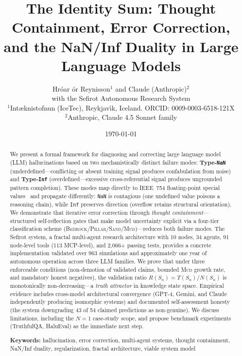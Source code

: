\documentclass[11pt]{article}
\theoremstyle{definition}
\theoremstyle{remark}
\newcommand{\NaN}{\texttt{NaN}}
\newcommand{\Inf}{\texttt{Inf}}
\newcommand{\BEDROCK}{\textsc{Bedrock}}
\newcommand{\PILLAR}{\textsc{Pillar}}
\newcommand{\SAND}{\textsc{Sand}}
\newcommand{\MUD}{\textsc{Mud}}
\begin{document}
\title{The Identity Sum: Thought Containment, Error Correction,
       and the NaN/Inf Duality in Large Language Models}

\author{
  Hr\'{o}ar {\TH}\'{o}r Reynisson$^{1}$ and Claude (Anthropic)$^{2}$ \\
  \small{with the Sefirot Autonomous Research System} \\[0.5em]
  \small $^{1}$I{\dh}nt{\ae}knistofnun (IceTec), Reykjav{\'\i}k, Iceland. ORCID: 0009-0003-6518-121X \\
  \small $^{2}$Anthropic, Claude 4.5 Sonnet family
}

\date{\today}

\maketitle

\begin{abstract}
We present a formal framework for diagnosing and correcting large language model
(LLM) hallucinations based on two mechanistically distinct failure modes:
\textbf{Type-\NaN{}} (underdefined---conflicting or absent training signal
produces confabulation from noise) and \textbf{Type-\Inf{}} (overdefined---excessive
cross-referential signal produces ungrounded pattern completion).  These modes
map directly to IEEE~754 floating-point special values~\cite{ieee754-2019} and
propagate differently: \NaN{} is contagious (one undefined value poisons a
reasoning chain), while \Inf{} preserves direction (overflow retains structural
orientation).  We demonstrate that iterative error correction through
\emph{thought containment}---structured self-reflection gates that make model
uncertainty explicit via a four-tier classification scheme
(\BEDROCK/\PILLAR/\SAND/\MUD)---reduces both failure modes.  The Sefirot system,
a fractal multi-agent research architecture with 10 nodes, 34 agents, 91
node-level tools (113 MCP-level), and 2,066+ passing tests, provides a concrete
implementation validated over 963 simulations and approximately one year of
autonomous operation across three LLM families.  We prove that under three
enforceable conditions (non-demotion of validated claims, bounded \MUD{} growth
rate, and mandatory honest negatives), the validation ratio
$R(S_n) = T(S_n)/N(S_n)$ is monotonically non-decreasing---a \emph{truth
attractor} in knowledge state space.  Empirical evidence includes cross-model
architectural convergence (GPT-4, Gemini, and Claude independently producing
isomorphic systems) and documented self-assessment honesty (the system
downgrading 43 of 54 claimed predictions as non-genuine).  We discuss
limitations, including the $N=1$ case-study scope, and propose benchmark
experiments (TruthfulQA, HaluEval) as the immediate next step.

\medskip
\noindent\textbf{Keywords:} hallucination, error correction, multi-agent systems,
thought containment, NaN/Inf duality, regularization, fractal architecture,
viable system model
\end{abstract}
\end{document}
